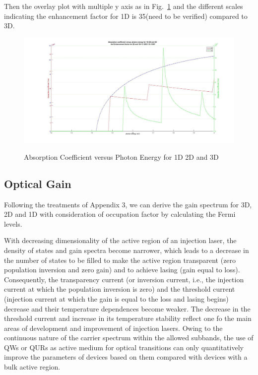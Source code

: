 Then the overlay plot with multiple y axis as in Fig.~\ref{absrate_overlay} and
the different scales indicating the enhancement factor for 1D is 35(need to be
verified) compared to 3D.

\begin{figure}
  \caption{Absorption Coefficient versus Photon Energy for 1D 2D and 3D}
  \centering
  \includegraphics[width=\textwidth]{pictures/LT/absrate_overlay}
  \label{absrate_overlay}
\end{figure}

\subsection{Optical Gain}

Following the treatments of Appendix 3, we can derive the gain spectrum for 3D,
2D and 1D with consideration of occupation factor by calculating the Fermi
levels.

With decreasing dimensionality of the active region of an injection laser, the
density of states and gain spectra become narrower, which leads to a decrease
in the number of states to be filled to make the active region transparent
(zero population inversion and zero gain) and to achieve lasing (gain equal to
loss). Consequently, the transparency current (or inversion current, i.e., the
injection current at which the population inversion is zero) and the threshold
current (injection current at which the gain is equal to the loss and lasing
begins) decrease and their temperature dependences become weaker. The decrease
in the threshold current and increase in its temperature stability reflect one
fo the main areas of development and improvement of injection lasers. Owing to
the continuous nature of the carrier spectrum within the allowed subbands, the
use of QWs or QURs as active medium for optical transitions can only
quantitatively improve the parameters of devices based on them compared with
devices with a bulk active region. 

